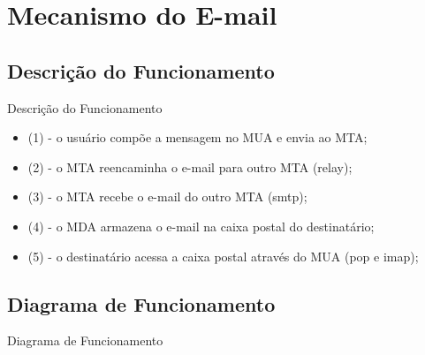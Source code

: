 \renewcommand{\titulo}{Mecanismo do E-mail}
\section{\titulo}

\renewcommand{\titulo}{Descrição do Funcionamento}
\subsection{\titulo}
\begin{frame}{\titulo}
\begin{itemize}
\item (1) - o usuário compõe a mensagem no MUA e envia ao MTA;
\item (2) - o MTA reencaminha o e-mail para outro MTA (relay);
\item (3) - o MTA recebe o e-mail do outro MTA (smtp);
\item (4) - o MDA armazena o e-mail na caixa postal do destinatário;
\item (5) - o destinatário acessa a caixa postal através do MUA (pop e imap);
\end{itemize}
\end{frame}

\renewcommand{\titulo}{Diagrama de Funcionamento}
\subsection{\titulo}
\begin{frame}{\titulo}
\end{frame}
